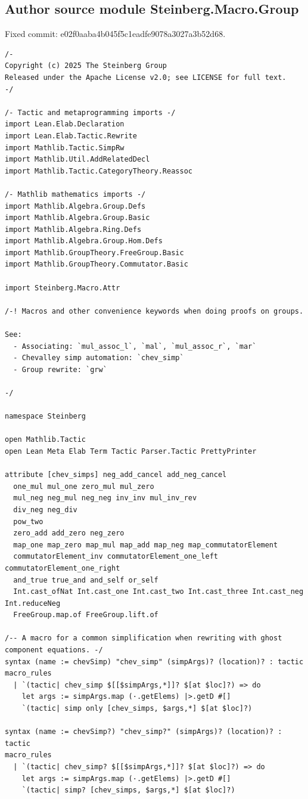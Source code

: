 \subsection*{Author source module Steinberg.Macro.Group}
\noindent Fixed commit: e02f0aaba4b045f5c1eadfe9078a3027a3b52d68.
\begin{Verbatim}
/-
Copyright (c) 2025 The Steinberg Group
Released under the Apache License v2.0; see LICENSE for full text.
-/

/- Tactic and metaprogramming imports -/
import Lean.Elab.Declaration
import Lean.Elab.Tactic.Rewrite
import Mathlib.Tactic.SimpRw
import Mathlib.Util.AddRelatedDecl
import Mathlib.Tactic.CategoryTheory.Reassoc

/- Mathlib mathematics imports -/
import Mathlib.Algebra.Group.Defs
import Mathlib.Algebra.Group.Basic
import Mathlib.Algebra.Ring.Defs
import Mathlib.Algebra.Group.Hom.Defs
import Mathlib.GroupTheory.FreeGroup.Basic
import Mathlib.GroupTheory.Commutator.Basic

import Steinberg.Macro.Attr

/-! Macros and other convenience keywords when doing proofs on groups.

See:
  - Associating: `mul_assoc_l`, `mal`, `mul_assoc_r`, `mar`
  - Chevalley simp automation: `chev_simp`
  - Group rewrite: `grw`

-/

namespace Steinberg

open Mathlib.Tactic
open Lean Meta Elab Term Tactic Parser.Tactic PrettyPrinter

attribute [chev_simps] neg_add_cancel add_neg_cancel
  one_mul mul_one zero_mul mul_zero
  mul_neg neg_mul neg_neg inv_inv mul_inv_rev
  div_neg neg_div
  pow_two
  zero_add add_zero neg_zero
  map_one map_zero map_mul map_add map_neg map_commutatorElement
  commutatorElement_inv commutatorElement_one_left commutatorElement_one_right
  and_true true_and and_self or_self
  Int.cast_ofNat Int.cast_one Int.cast_two Int.cast_three Int.cast_neg Int.reduceNeg
  FreeGroup.map.of FreeGroup.lift.of

/-- A macro for a common simplification when rewriting with ghost component equations. -/
syntax (name := chevSimp) "chev_simp" (simpArgs)? (location)? : tactic
macro_rules
  | `(tactic| chev_simp $[[$simpArgs,*]]? $[at $loc]?) => do
    let args := simpArgs.map (·.getElems) |>.getD #[]
    `(tactic| simp only [chev_simps, $args,*] $[at $loc]?)

syntax (name := chevSimp?) "chev_simp?" (simpArgs)? (location)? : tactic
macro_rules
  | `(tactic| chev_simp? $[[$simpArgs,*]]? $[at $loc]?) => do
    let args := simpArgs.map (·.getElems) |>.getD #[]
    `(tactic| simp? [chev_simps, $args,*] $[at $loc]?)


\end{Verbatim}
